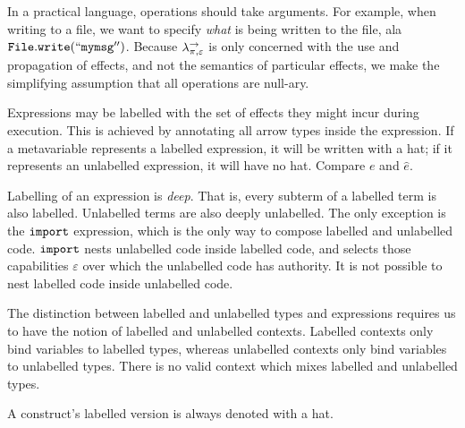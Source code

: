 In a practical language, operations should take arguments. For example, when writing to a file, we want to specify \textit{what} is being written to the file, ala $\mathtt{File.write(``my msg'')}$. Because $\lambda^{\rightarrow}_{\pi, \varepsilon}$ is only concerned with the use and propagation of effects, and not the semantics of particular effects, we make the simplifying assumption that all operations are null-ary.

Expressions may be labelled with the set of effects they might incur during execution. This is achieved by annotating all arrow types inside the expression. If a metavariable represents a labelled expression, it will be written with a hat; if it represents an unlabelled expression, it will have no hat. Compare $e$ and $\hat e$.

Labelling of an expression is \textit{deep}. That is, every subterm of a labelled term is also labelled. Unlabelled terms are also deeply unlabelled. The only exception is the $\mathtt{import}$ expression, which is the only way to compose labelled and unlabelled code. $\mathtt{import}$ nests unlabelled code inside labelled code, and selects those capabilities $\varepsilon$ over which the unlabelled code has authority. It is not possible to nest labelled code inside unlabelled code.

The distinction between labelled and unlabelled types and expressions requires us to have the notion of labelled and unlabelled contexts. Labelled contexts only bind variables to labelled types, whereas unlabelled contexts only bind variables to unlabelled types. There is no valid context which mixes labelled and unlabelled types.

A construct's labelled version is always denoted with a hat. \\

